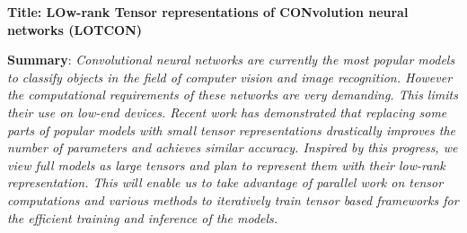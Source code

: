 
\usepackage{xspace}




%

\renewcommand{\prname}{LOTCON\xspace}
\renewcommand{\piname}{PI: Suraj KUMAR (LIP, ENS \& Inria Lyon)}

\noindent \textbf{Title: {\sc LOw-rank Tensor representations of CONvolution neural networks (LOTCON)}}



\bigskip

\noindent \textbf{Summary}: \emph{Convolutional neural networks are currently the most popular models to classify objects in the field of computer vision and image recognition. However the computational requirements of these networks are very demanding. This limits their use on low-end devices. Recent work has demonstrated that replacing some parts of popular models with small tensor representations drastically improves the number of parameters and achieves similar accuracy. Inspired by this progress, we view full models as large tensors and plan to represent them with their low-rank representation. This will enable us to take advantage of parallel work on tensor computations and various methods to iteratively train tensor based frameworks for the efficient training and inference of the models.}

